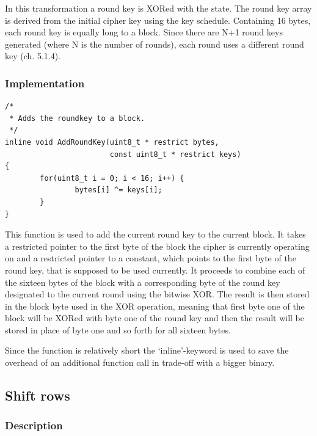 In this transformation a round key is
XORed with the state. The round key array is
derived from the initial cipher key using the key schedule. Containing
16 bytes, each round key is equally long to a block. Since there are N+1
round keys generated (where N is the number of rounds), each round uses
a different round key (ch. 5.1.4).

\hypertarget{implementation-2}{%
\subsubsection{Implementation}\label{implementation-2}}

\begin{lstlisting}
/*
 * Adds the roundkey to a block.
 */
inline void AddRoundKey(uint8_t * restrict bytes,
                        const uint8_t * restrict keys)
{
        for(uint8_t i = 0; i < 16; i++) {
                bytes[i] ^= keys[i];
        }
}
\end{lstlisting}

This function is used to add the current round key to the current block.
It takes a restricted pointer to the first byte of the block the cipher
is currently operating on and a restricted pointer to a constant, which
points to the first byte of the round key, that is supposed to be used
currently. It proceeds to combine each of the sixteen bytes of the block
with a corresponding byte of the round key designated to the current
round using the bitwise XOR. The result is then stored in the block byte
used in the XOR operation, meaning that first byte one of the block will
be XORed with byte one of the round key and then the result will be
stored in place of byte one and so forth for all sixteen bytes.

Since the function is relatively short the `inline'-keyword is used to
save the overhead of an additional function call in trade-off with a
bigger binary.

\hypertarget{shift-rows}{%
\subsection{Shift rows}\label{shift-rows}}

\hypertarget{description-3}{%
\subsubsection{Description}\label{description-3}}

